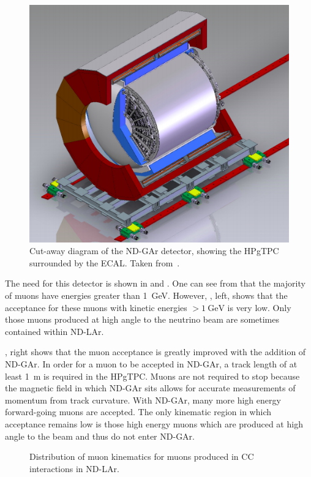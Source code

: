 \begin{figure}[h]
  \centering
  \includegraphics[width=.7\linewidth]{files/figures/dune_detector/ndGarDiag}
  \caption[Cut-away of the ND-GAr detector.]{Cut-away diagram of the ND-GAr detector, showing the HPgTPC surrounded by the ECAL. Taken from~\cite{ndCdr}.}
  \label{fig:ndGarDiag}
\end{figure}

The need for this detector is shown in  and .
One can see from  that the majority of muons have energies greater than \SI{1}{\giga\electronvolt}.
However, , left, shows that the acceptance for these muons with kinetic energies $>\SI{1}{\giga\electronvolt}$ is very low.
Only those muons produced at high angle to the neutrino beam are sometimes contained within ND-LAr.

, right shows that the muon acceptance is greatly improved with the addition of ND-GAr.
In order for a muon to be accepted in ND-GAr, a track length of at least \SI{1}{\metre} is required in the HPgTPC.
Muons are not required to stop because the magnetic field in which ND-GAr sits allows for accurate measurements of momentum from track curvature.
With ND-GAr, many more high energy forward-going muons are accepted.
The only kinematic region in which acceptance remains low is those high energy muons which are produced at high angle to the beam and thus do not enter ND-GAr. 

\begin{figure}[h]
  \begin{adjustbox}{max totalsize={.7\textwidth}, center}
    
  \end{adjustbox}
  \caption[Muon kinematics in the DUNE ND]{Distribution of muon kinematics for muons produced in \numu CC interactions in ND-LAr.}
  \label{fig:muonKinematics}
\end{figure}

